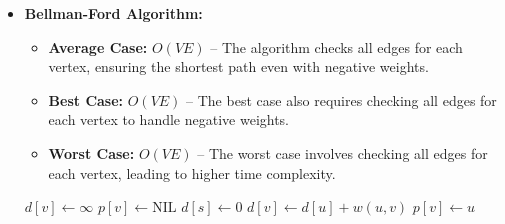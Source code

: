 \documentclass[12pt]{book} %
\begin{document}
\begin{itemize}

    \item \textbf{Bellman-Ford Algorithm:}
        \begin{itemize}
            \item \textbf{Average Case:} $O(VE)$ – The algorithm checks all edges for each vertex, ensuring the shortest path even with negative weights.
            \item \textbf{Best Case:} $O(VE)$ – The best case also requires checking all edges for each vertex to handle negative weights.
            \item \textbf{Worst Case:} $O(VE)$ – The worst case involves checking all edges for each vertex, leading to higher time complexity.
        \end{itemize}
        \begin{algorithm}
            \caption{Bellman-Ford Algorithm}
            \begin{algorithmic}[1]
                        \State $d[v] \gets \infty$
                        \State $p[v] \gets \text{NIL}$
                    \EndFor
                    \State $d[s] \gets 0$
                                \State $d[v] \gets d[u] + w(u, v)$
                                \State $p[v] \gets u$
                            \EndIf
                        \EndFor
                    \EndFor
                            \State \Return {} 
                        \EndIf
                    \EndFor
                    \State \Return {}
                    \EndProcedure
                \end{algorithmic}
            \end{algorithm}
            \begin{tikzpicture}

\end{tikzpicture}
\end{itemize}
\end{document}
